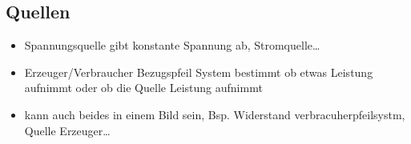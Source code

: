 \documentclass[a4paper,12pt]{article}
\begin{document}
\subsection*{Quellen}

\begin{itemize}
    \item Spannungsquelle gibt konstante Spannung ab, Stromquelle\dots
    \item Erzeuger/Verbraucher Bezugspfeil System bestimmt ob etwas Leistung aufnimmt oder ob die Quelle Leistung aufnimmt
    \item kann auch beides in einem Bild sein, Bsp. Widerstand verbracuherpfeilsystm, Quelle Erzeuger\dots
\end{itemize}
\end{document}
